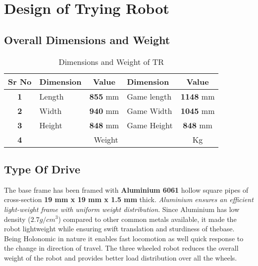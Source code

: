 \section{Design of Trying Robot}
    \subsection{Overall Dimensions and Weight}
        \begin{table}[h]
            \caption{Dimensions and Weight of TR} \label{Dimensions_TR} \small
            \begin{tabular}{|c|l|c|l|c|}
                \hline
                \textbf{Sr No}  & \textbf{Dimension} & \textbf{Value}  & \textbf{Dimension}      & \textbf{Value}   \\ \hline
                \textbf{1}      & Length             & \textbf{855} mm & Game length             & \textbf{1148} mm \\ \hline
                \textbf{2}      & Width              & \textbf{940} mm & Game Width              & \textbf{1045} mm \\ \hline
                \textbf{3}      & Height             & \textbf{848} mm & Game Height             & \textbf{848} mm  \\ \hline
                \textbf{4}      & \multicolumn{3}{c|}{Weight}                                    & \textbf{} Kg     \\ \hline
            \end{tabular}
        \end{table}

    \subsection{Type Of Drive}
        The base frame has been framed with \textbf{Aluminium 6061} hollow square pipes of cross-section \textbf{19 mm x 19 mm x 1.5 mm} thick. 
        \textit{Aluminium ensures an efficient light-weight frame with uniform weight distribution}. Since Aluminium has low density ($2.7 g/cm^3$) compared 
        to other common metals available, it made the robot lightweight while ensuring swift translation and sturdiness of thebase. Being Holonomic 
        in nature it enables fast locomotion as well quick response to the change in direction of travel. The three wheeled robot reduces the 
        overall weight of the robot and provides better load distribution over all the wheels.

